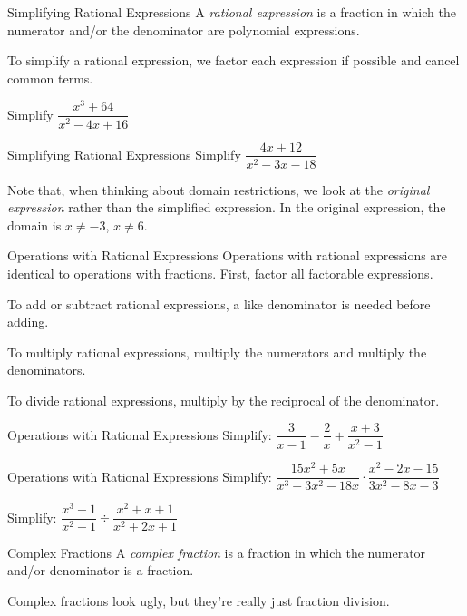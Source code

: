\documentclass{beamer}
\begin{document}
\begin{frame}[t]{Simplifying Rational Expressions}
A \textit{rational expression} is a fraction in which the numerator and/or the denominator are polynomial expressions.

To simplify a rational expression, we factor each expression if possible and cancel common terms.

\pause

Simplify $\dfrac{x^3 + 64}{x^2 - 4x + 16}$
\end{frame}

\begin{frame}[t]{Simplifying Rational Expressions}
Simplify $\dfrac{4x+12}{x^2 - 3x - 18}$

\pause \vfill

Note that, when thinking about domain restrictions, we look at the \textit{original expression} rather than the simplified expression. In the original expression, the domain is $x \neq -3$, $x \neq 6$.

\end{frame}

\begin{frame}[t]{Operations with Rational Expressions}
Operations with rational expressions are identical to operations with fractions. First, factor all factorable expressions. \pause

To add or subtract rational expressions, a like denominator is needed before adding. \pause

To multiply rational expressions, multiply the numerators and multiply the denominators. \pause

To divide rational expressions, multiply by the reciprocal of the denominator.
\end{frame}

\begin{frame}[t]{Operations with Rational Expressions}
Simplify: $\dfrac{3}{x-1} - \dfrac{2}{x} + \dfrac{x+3}{x^2 - 1}$
\end{frame}

\begin{frame}[t]{Operations with Rational Expressions}
Simplify: $\dfrac{15x^2 + 5x}{x^3 - 3x^2 - 18x} \cdot \dfrac{x^2 - 2x - 15}{3x^2 - 8x - 3}$

\pause \vfill

Simplify: $\dfrac{x^3 - 1}{x^2 - 1} \div \dfrac{x^2 + x + 1}{x^2 + 2x + 1}$
\end{frame}

\begin{frame}[t]{Complex Fractions}
A \textit{complex fraction} is a fraction in which the numerator and/or denominator is a fraction.

Complex fractions look ugly, but they're really just fraction division.
\end{frame}
\end{document}
